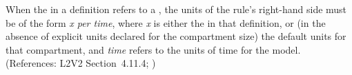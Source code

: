 When the  in a \RateRule definition refers to a
\Compartment, the units of the rule's right-hand side must be of the form
\emph{x per time}, where \emph{x} is either the  in that
\Compartment definition, or (in the absence of explicit units declared for
the compartment size) the default units for that compartment, and
\emph{time} refers to the units of time for the model.  (References: L2V2
Section~4.11.4; )
